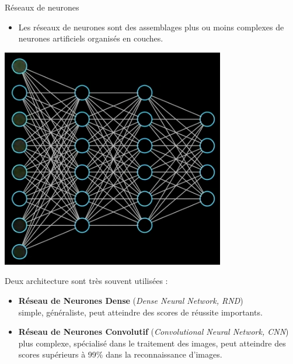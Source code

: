 \documentclass[10pt,serif,mathserif,compress,hyperref={colorlinks}]{beamer}
\begin{document}
\begin{frame}{Réseaux de neurones}

  \begin{minipage}{.6\textwidth}
    \begin{itemize}
    \item Les réseaux de neurones sont des assemblages plus ou moins complexes de neurones artificiels organisés en couches.
    \end{itemize}
  \end{minipage}\begin{minipage}{.4\textwidth}
    \vspace*{-6mm}\includegraphics[width=\textwidth]{images/RN.png}
  \end{minipage}
  
  Deux architecture sont très souvent utilisées :
  \begin{itemize}
    \item \textbf{Réseau de Neurones Dense} ({\em Dense Neural Network, RND})\\
      simple, généraliste, peut atteindre des scores de réussite importants.
    \item \textbf{Réseau de Neurones Convolutif} ({\em Convolutional Neural Network, CNN})\\
      plus complexe, spécialisé dans le traitement des images, peut atteindre des scores supérieurs à 99\% dans la reconnaissance d'images.
  \end{itemize}
  
\end{frame}
\end{document}
